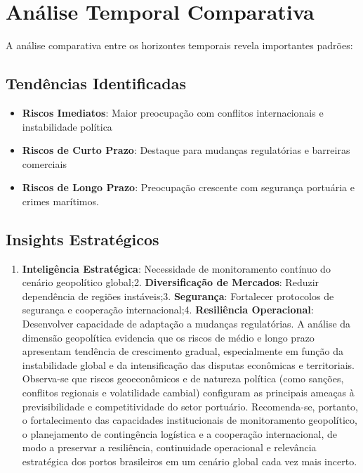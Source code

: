 \documentclass[
  portuguese,
  letterpaper,
  DIV=11,
  numbers=noendperiod]{scrreprt}
\providecommand{\tightlist}{%
  \setlength{\itemsep}{0pt}\setlength{\parskip}{0pt}}
\begin{document}
\section{Análise Temporal
Comparativa}\label{anuxe1lise-temporal-comparativa-2}

A análise comparativa entre os horizontes temporais revela importantes
padrões:

\subsection{Tendências
Identificadas}\label{tenduxeancias-identificadas-2}

\begin{itemize}
\tightlist
\item
  \textbf{Riscos Imediatos}: Maior preocupação com conflitos
  internacionais e instabilidade política
\item
  \textbf{Riscos de Curto Prazo}: Destaque para mudanças regulatórias e
  barreiras comerciais
\item
  \textbf{Riscos de Longo Prazo}: Preocupação crescente com segurança
  portuária e crimes marítimos.
\end{itemize}

\subsection{Insights Estratégicos}\label{insights-estratuxe9gicos-2}

\begin{enumerate}
\def\labelenumi{\arabic{enumi}.}
\tightlist
\item
  \textbf{Inteligência Estratégica}: Necessidade de monitoramento
  contínuo do cenário geopolítico global;2. \textbf{Diversificação de
  Mercados}: Reduzir dependência de regiões instáveis;3.
  \textbf{Segurança}: Fortalecer protocolos de segurança e cooperação
  internacional;4. \textbf{Resiliência Operacional}: Desenvolver
  capacidade de adaptação a mudanças regulatórias. A análise da dimensão
  geopolítica evidencia que os riscos de médio e longo prazo apresentam
  tendência de crescimento gradual, especialmente em função da
  instabilidade global e da intensificação das disputas econômicas e
  territoriais. Observa-se que riscos geoeconômicos e de natureza
  política (como sanções, conflitos regionais e volatilidade cambial)
  configuram as principais ameaças à previsibilidade e competitividade
  do setor portuário. Recomenda-se, portanto, o fortalecimento das
  capacidades institucionais de monitoramento geopolítico, o
  planejamento de contingência logística e a cooperação internacional,
  de modo a preservar a resiliência, continuidade operacional e
  relevância estratégica dos portos brasileiros em um cenário global
  cada vez mais incerto.
\end{enumerate}
\end{document}
